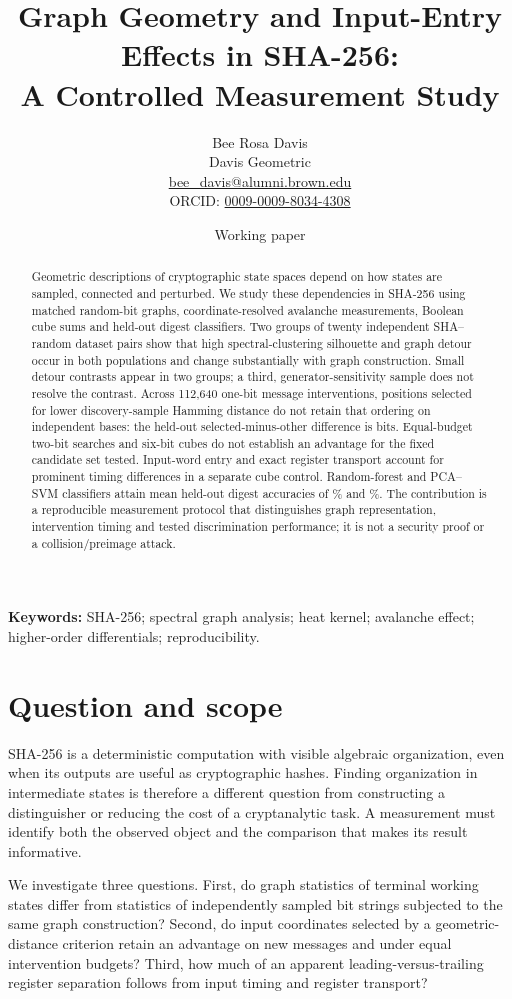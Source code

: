 \documentclass[11pt]{article}
\title{Graph Geometry and Input-Entry Effects in SHA-256:\\A Controlled Measurement Study}
\author{Bee Rosa Davis\\Davis Geometric\\\small \href{mailto:bee_davis@alumni.brown.edu}{bee\_davis@alumni.brown.edu}\\\small ORCID: \href{https://orcid.org/0009-0009-8034-4308}{0009-0009-8034-4308}}
\date{Working paper}
\begin{document}
\maketitle
\begin{abstract}
Geometric descriptions of cryptographic state spaces depend on how states are sampled, connected and perturbed. We study these dependencies in SHA-256 using matched random-bit graphs, coordinate-resolved avalanche measurements, Boolean cube sums and held-out digest classifiers. Two groups of twenty independent SHA--random dataset pairs show that high spectral-clustering silhouette and graph detour occur in both populations and change substantially with graph construction. Small detour contrasts appear in two groups; a third, generator-sensitivity sample does not resolve the contrast. Across 112,640 one-bit message interventions, positions selected for lower discovery-sample Hamming distance do not retain that ordering on independent bases: the held-out selected-minus-other difference is \HoldoutDifference{} bits. Equal-budget two-bit searches and six-bit cubes do not establish an advantage for the fixed candidate set tested. Input-word entry and exact register transport account for prominent timing differences in a separate cube control. Random-forest and PCA--SVM classifiers attain mean held-out digest accuracies of \RFAccuracy\% and \SVMAccuracy\%. The contribution is a reproducible measurement protocol that distinguishes graph representation, intervention timing and tested discrimination performance; it is not a security proof or a collision/preimage attack.
\end{abstract}
\noindent\textbf{Keywords:} SHA-256; spectral graph analysis; heat kernel; avalanche effect; higher-order differentials; reproducibility.

\section{Question and scope}
SHA-256 is a deterministic computation with visible algebraic organization, even when its outputs are useful as cryptographic hashes. Finding organization in intermediate states is therefore a different question from constructing a distinguisher or reducing the cost of a cryptanalytic task. A measurement must identify both the observed object and the comparison that makes its result informative.

We investigate three questions. First, do graph statistics of terminal working states differ from statistics of independently sampled bit strings subjected to the same graph construction? Second, do input coordinates selected by a geometric-distance criterion retain an advantage on new messages and under equal intervention budgets? Third, how much of an apparent leading-versus-trailing register separation follows from input timing and register transport?
\end{document}
